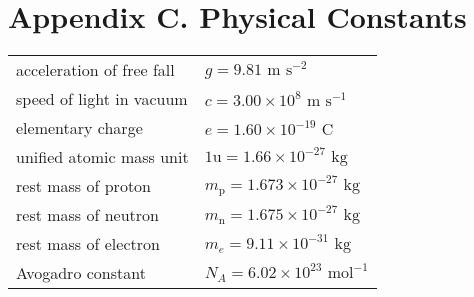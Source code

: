 \section*{Appendix C. Physical Constants}

\vspace*{-2em}
{
{

\begin{longtable}{p{} p{}}
	acceleration of free fall & $g=9.81 \text{ m s}^{-2}$ \\
	speed of light in vacuum & $c = 3.00 \times 10^8 \text{ m s}^{-1}$ \\
	elementary charge & $e = 1.60\times10^{-19} \text{ C}$ \\
	unified atomic mass unit & $1 \text{u} = 1.66\times10^{-27} \text{ kg}$ \\
	rest mass of proton & $m_\text{p} = 1.673 \times 10^{-27} \text{ kg}$ \\
	rest mass of neutron & $m_\text{n} = 1.675 \times 10^{-27} \text{ kg}$ \\
	rest mass of electron & $m_e = 9.11 \times 10^{-31} \text{ kg}$ \\
	Avogadro constant & $N_A = 6.02 \times 10^{23} \text{ mol}^{-1}$ \\
\end{longtable} 

}\par}